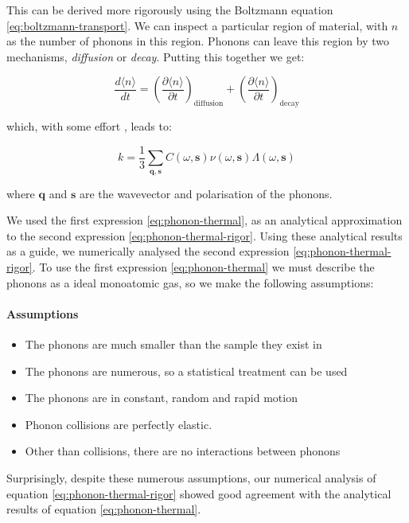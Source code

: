 \documentclass[12pt]{article}
\renewcommand{\vec}[1]{\mathbf{#1}}
\begin{document}
This can be derived more rigorously using the Boltzmann equation \eqref{eq:boltzmann-transport}. We can inspect a particular region of material, with $n$ as the number of phonons in this region. Phonons can leave this region by two mechanisms, \emph{diffusion} or \emph{decay}. Putting this together we get:

\begin{equation}
\label{eq:boltz-phonon-thermal}
	\frac{d \langle n \rangle}{dt} = \left(\frac{\partial \langle n \rangle}{\partial t}\right)_\mathrm{diffusion} + \left(\frac{\partial \langle n \rangle}{\partial t}\right)_\mathrm{decay}
\end{equation}

which, with some effort \cite{gp}, leads to:

\begin{equation}
\label{eq:phonon-thermal-rigor}
	k = \frac{1}{3} \sum_{\vec{q}, \vec{s}} C (\omega, \vec{s}) \nu (\omega, \vec{s}) \Lambda (\omega, \vec{s})
\end{equation}

where $\vec{q}$ and $\vec{s}$ are the wavevector and polarisation of the phonons.

We used the first expression \eqref{eq:phonon-thermal}, as an analytical approximation to the second expression \eqref{eq:phonon-thermal-rigor}. Using these analytical results as a guide, we numerically analysed the second expression \eqref{eq:phonon-thermal-rigor}. To use the first expression \eqref{eq:phonon-thermal} we must describe the phonons as a ideal monoatomic gas, so we make the following assumptions:
\paragraph{Assumptions}
\begin{itemize}
  \item The phonons are much smaller than the sample they exist in
  \item The phonons are numerous, so a statistical treatment can be used
  \item The phonons are in constant, random and rapid motion
  \item Phonon collisions are perfectly elastic.
  \item Other than collisions, there are no interactions between phonons
\end{itemize}

Surprisingly, despite these numerous assumptions, our numerical analysis of equation \eqref{eq:phonon-thermal-rigor} showed good agreement with the analytical results of equation \eqref{eq:phonon-thermal}. 
\end{document}
